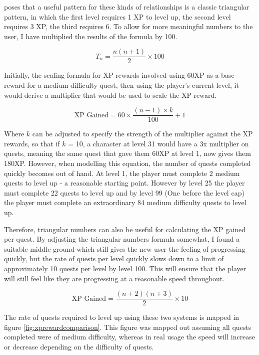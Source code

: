 \cite{1_anderson_2016} poses that a useful pattern for these kinds of relationships is a classic triangular pattern, in which the first level requires 1 XP to level up, the second level requires 3 XP, the third requires 6. To allow for more meaningful numbers to the user, I have multiplied the results of the formula by 100.

\begin{equation} \label{eq:xprequiredfornextlevel}
	T_n= \frac{n(n+1)}{2} \times 100
\end{equation}

Initially, the scaling formula for XP rewards involved using 60XP as a base reward for a medium difficulty quest, then using the player's current level, it would derive a multiplier that would be used to scale the XP reward.

\begin{equation} \label{eq:xpgainedlinear}
	\textrm{XP Gained} = 60 \times \frac{(n - 1) \times k}{100} + 1
\end{equation}

Where $k$ can be adjusted to specify the strength of the multiplier against the XP rewards, so that if $k$ = 10, a character at level 31 would have a 3x multiplier on quests, meaning the same quest that gave them 60XP at level 1, now gives them 180XP.
However, when modelling this equation, the number of quests completed quickly becomes out of hand. 
At level 1, the player must complete 2 medium quests to level up - a reasonable starting point.
However by level 25 the player must complete 22 quests to level up and by level 99 (One before the level cap) the player must complete an extraordinary 84 medium difficulty quests to level up.

Therefore, triangular numbers can also be useful for calculating the XP gained per quest. By adjusting the triangular numbers formula somewhat, I found a suitable middle ground which still gives the new user the feeling of progressing quickly, but the rate of quests per level quickly slows down to a limit of approximately 10 quests per level by level 100.
This will ensure that the player will still feel like they are progressing at a reasonable speed throughout.

\begin{equation} \label{eq:xpgainedtriangular}
	\textrm{XP Gained} = \frac{(n+2)(n+3)}{2} \times 10
\end{equation}

The rate of quests required to level up using these two systems is mapped in figure \ref{fig:xprewardcomparison}.
This figure was mapped out assuming all quests completed were of medium difficulty, whereas in real usage the speed will increase or decrease depending on the difficulty of quests.

